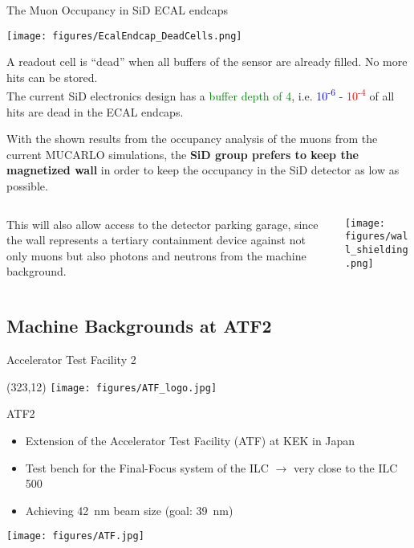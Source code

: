 \documentclass[xcolor={dvipsnames}]{beamer}
\newcommand{\ATFlogo}{
  \setlength{\TPHorizModule}{1pt}
  \setlength{\TPVertModule}{1pt}
  \begin{textblock}{1}(323,12)
   \texttt{[image: figures/ATF\_logo.jpg]}
  \end{textblock}
}
\begin{document}
\begin{frame}{The Muon Occupancy in SiD ECAL endcaps}
\begin{center}
  \texttt{[image: figures/EcalEndcap\_DeadCells.png]}
\end{center}
{\small A readout cell is ``dead'' when all buffers of the sensor are already filled. No more hits can be stored.}\\
The current SiD electronics design has a \textcolor{Green}{buffer depth of 4}, i.e. \textcolor{Blue}{10\textsuperscript{-6}} - \textcolor{Red}{10\textsuperscript{-4}} of all hits are dead in the ECAL endcaps.
\end{frame}
\begin{frame}
 With the shown results from the occupancy analysis of the muons from the current MUCARLO simulations, the \textbf{SiD group prefers to keep the magnetized wall} in order to keep the occupancy in the SiD detector as low as possible.
 \begin{columns}
  \begin{column}{0.4\textwidth}
    This will also allow access to the detector parking garage, since the wall represents a tertiary containment device against not only muons but also photons and neutrons from the machine background.
  \end{column}
  \begin{column}{0.6\textwidth}
    \texttt{[image: figures/wall\_shielding.png]}
  \end{column}
 \end{columns}
\end{frame}

\subsection{Machine Backgrounds at ATF2}

\begin{frame}{Accelerator Test Facility 2}
\ATFlogo
ATF2
\begin{itemize}
\item Extension of the Accelerator Test Facility (ATF) at KEK in Japan
\item Test bench for the Final-Focus system of the ILC $\rightarrow$ very close to the ILC 500
\item Achieving \SI{42}{\nano\metre} beam size (goal: \SI{39}{\nano\metre})
\end{itemize}
\vspace*{0.3cm}
\begin{center}
 	\texttt{[image: figures/ATF.jpg]}
\end{center}

\end{frame}
\end{document}
